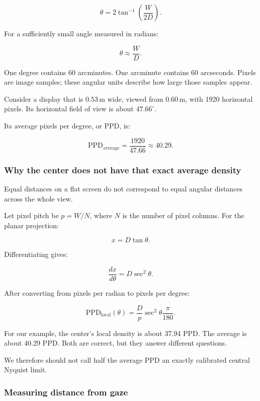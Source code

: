 \[
\theta=2\tan^{-1}\left(\frac{W}{2D}\right).
\]

For a sufficiently small angle measured in radians:

\[
\theta\approx\frac{W}{D}.
\]

One degree contains 60 arcminutes. One arcminute contains 60 arcseconds. Pixels are image samples; these angular units describe how large those samples appear.

Consider a display that is \(0.53\,\mathrm{m}\) wide, viewed from \(0.60\,\mathrm{m}\), with 1920 horizontal pixels. Its horizontal field of view is about \(47.66^\circ\).

Its average pixels per degree, or PPD, is:

\[
\mathrm{PPD}_{\mathrm{average}}
=\frac{1920}{47.66}
\approx40.29.
\]

\subsubsection{Why the center does not have that exact average density}\label{04-visual-computing-ii-ch042-why-the-center-does-not-have-that-exact-average-density}

\hypertarget{04-visual-computing-ii-ch042-why-the-center-does-not-have-that-exact-average-density}{}

Equal distances on a flat screen do not correspond to equal angular distances across the whole view.

Let pixel pitch be \(p=W/N\), where \(N\) is the number of pixel columns. For the planar projection:

\[
x=D\tan\theta.
\]

Differentiating gives:

\[
\frac{dx}{d\theta}=D\sec^2\theta.
\]

After converting from pixels per radian to pixels per degree:

\[
\mathrm{PPD}_{\mathrm{local}}(\theta)
=\frac{D}{p}\sec^2\theta\frac{\pi}{180}.
\]

For our example, the center's local density is about 37.94 PPD. The average is about 40.29 PPD. Both are correct, but they answer different questions.

We therefore should not call half the average PPD an exactly calibrated central Nyquist limit.

\subsubsection{Measuring distance from gaze}\label{04-visual-computing-ii-ch042-measuring-distance-from-gaze}

